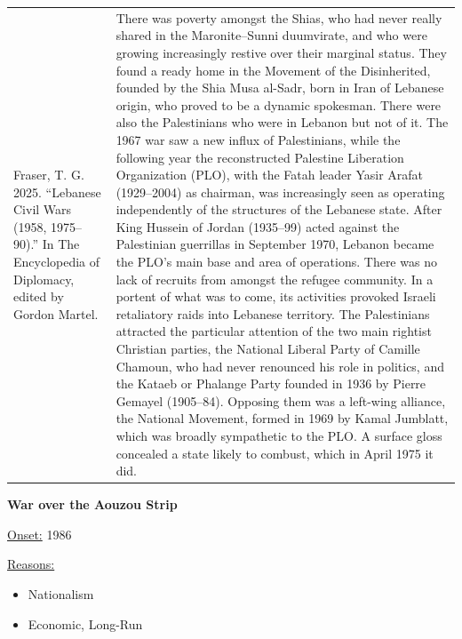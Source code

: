 {\begin{longtable}{p{}p{}}
Fraser, T. G. 2025. “Lebanese Civil Wars (1958, 1975–90).” In The Encyclopedia of Diplomacy, edited by Gordon Martel. & There was poverty amongst the Shias, who had never really shared in the Maronite–Sunni duumvirate, and who were growing increasingly restive over their marginal status. They found a ready home in the Movement of the Disinherited, founded by the Shia Musa al-Sadr, born in Iran of Lebanese origin, who proved to be a dynamic spokesman. There were also the Palestinians who were in Lebanon but not of it. The 1967 war saw a new influx of Palestinians, while the following year the reconstructed Palestine Liberation Organization (PLO), with the Fatah leader Yasir Arafat (1929–2004) as chairman, was increasingly seen as operating independently of the structures of the Lebanese state. After King Hussein of Jordan (1935–99) acted against the Palestinian guerrillas in September 1970, Lebanon became the PLO's main base and area of operations. There was no lack of recruits from amongst the refugee community. In a portent of what was to come, its activities provoked Israeli retaliatory raids into Lebanese territory. The Palestinians attracted the particular attention of the two main rightist Christian parties, the National Liberal Party of Camille Chamoun, who had never renounced his role in politics, and the Kataeb or Phalange Party founded in 1936 by Pierre Gemayel (1905–84). Opposing them was a left-wing alliance, the National Movement, formed in 1969 by Kamal Jumblatt, which was broadly sympathetic to the PLO. A surface gloss concealed a state likely to combust, which in April 1975 it did.
\\
\end{longtable}}
\clearpage
         \textbf{War over the Aouzou Strip} 

          \underline{Onset:} 1986         

\underline{Reasons:}
\begin{itemize}
\item Nationalism
\item Economic, Long-Run
\end{itemize}

